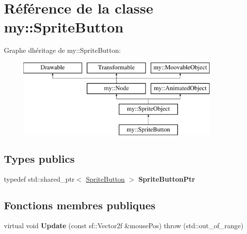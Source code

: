 \hypertarget{classmy_1_1SpriteButton}{}\section{Référence de la classe my\+:\+:Sprite\+Button}
\label{classmy_1_1SpriteButton}
Graphe d\textquotesingle{}héritage de my\+:\+:Sprite\+Button\+:\begin{figure}[H]
\begin{center}
\leavevmode
\includegraphics[height=4.000000cm]{classmy_1_1SpriteButton}
\end{center}
\end{figure}
\subsection*{Types publics}
\begin{DoxyCompactItemize}
\item 
\mbox{\label{classmy_1_1SpriteButton_ac168ec0a97a3c5ea31154e654157393b}} 
typedef std\+::shared\+\_\+ptr$<$ \hyperlink{classmy_1_1SpriteButton}{Sprite\+Button} $>$ {\bfseries Sprite\+Button\+Ptr}
\end{DoxyCompactItemize}
\subsection*{Fonctions membres publiques}
\begin{DoxyCompactItemize}
\item 
\mbox{\label{classmy_1_1SpriteButton_a84f4ff8cdb411c3e9d555eacd390f19c}} 
virtual void {\bfseries Update} (const sf\+::\+Vector2f \&mouse\+Pos)  throw (std\+::out\+\_\+of\+\_\+range)
\end{DoxyCompactItemize}
